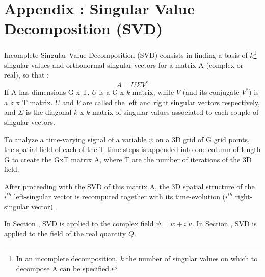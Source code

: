 \section{Appendix : Singular Value Decomposition (SVD)}
\label{annexeSVD}
Incomplete Singular Value Decomposition (SVD) consists in finding a basis of $k$\footnote{In an incomplete decomposition, $k$ the number of singular values on which to decompose A can be specified.} singular values and orthonormal singular vectors for a matrix A (complex or real), so that :
\begin{equation}
A = U \Sigma V^* 
\end{equation}
If A has dimensions G x T, $U$ is a G x $k$ matrix, while $V$ (and its conjugate $V^*$) is a k x T matrix. $U$ and $V$ are called the left and right singular vectors respectively, and $\Sigma$ is the diagonal $k$ x $k$ matrix of singular values associated to each couple of singular vectors.

To analyze a time-varying signal of a variable $\psi$ on a 3D grid of G grid points, the spatial field of each of the T time-steps is appended into one column of length G to create the GxT matrix A, where T are the number of iterations of the 3D field. 

After proceeding with the SVD of this matrix A, the 3D spatial structure of the $i^{th}$ left-singular vector is recomputed together with its time-evolution ($i^{th}$ right-singular vector).

In Section , SVD is applied to the complex field $\psi=w+i\ u$. %
In Section , SVD is applied to the field of the real quantity $Q$.
